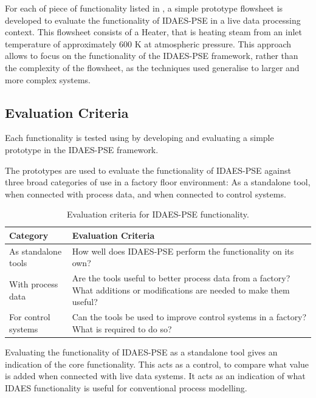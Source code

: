 \documentclass[12pt]{article}
\begin{document}
For each of piece of functionality listed in , a simple prototype flowsheet is developed to evaluate the functionality of IDAES-PSE in a live data processing context. This flowsheet consists of a Heater, that is heating steam from an inlet temperature of approximately 600 K at atmospheric pressure. This approach allows to focus on the functionality of the IDAES-PSE framework, rather than the complexity of the flowsheet, as the techniques used generalise to larger and more complex systems.


\subsection{Evaluation Criteria}

Each functionality is tested using by developing and evaluating a simple prototype in the IDAES-PSE framework. 

The prototypes are used to evaluate the functionality of IDAES-PSE against three broad categories of use in a factory floor environment: As a standalone tool, when connected with process data, and when connected to control systems. 

\begin{table}[h]
    \centering
    \begin{tabular}{|l|p{10cm}|}
        \hline
        \textbf{Category} & \textbf{Evaluation Criteria} \\
        \hline
        As standalone tools & How well does IDAES-PSE perform the functionality on its own? \\
        \hline
        With process data & Are the tools useful to better process data from a factory? What additions or modifications are needed to make them useful? \\
        \hline
        For control systems & Can the tools be used to improve control systems in a factory? What  is required to do so? \\
        \hline
    \end{tabular}
    \caption{Evaluation criteria for IDAES-PSE functionality.}
    \label{tab:evaluation_criteria}
\end{table}

Evaluating the functionality of IDAES-PSE as a standalone tool gives an indication of the core functionality. This acts as a control, to compare what value is added when connected with live data systems. It acts as an indication of what IDAES functionality is useful for conventional process modelling.
\end{document}
